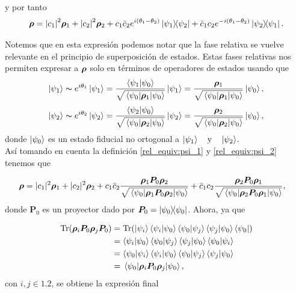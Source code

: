 \documentclass[../Main.tex]{subfiles}
\begin{document}
y por tanto 
\begin{equation}
    \bm{\rho} = \abs{c_1}^2\bm{\rho}_1+\abs{c_2}^2\bm{\rho}_2+c_1\bar{c}_2 e^{i(\theta_1-\theta_2)}\op{\psi_1}{\psi_2}+\bar{c}_1c_2 e^{-i(\theta_1-\theta_2)}\op{\psi_2}{\psi_1}.
\end{equation}

Notemos que en esta expresión podemos notar que la fase relativa se vuelve relevante en el principio de superposición de estados. Estas fases relativas nos permiten expresar a $\bm{\rho}$ solo en términos de operadores de estados usando que
\begin{equation}
    \ket{\psi_1}\thicksim  e^{i\theta_1}\ket{\psi_1}=\frac{\ip{\psi_1}{\psi_0}}{\sqrt{\expval{\rhon_1}{\psi_0}}}\ket{\psi_1}=\frac{\rhon_1}{\sqrt{\expval{\rhon_1}{\psi_0}}}\ket{\psi_0},
    \label{rel_equiv:psi_1}
\end{equation}
\begin{equation}
    \ket{\psi_2}\thicksim  e^{i\theta_2}\ket{\psi_2}=\frac{\ip{\psi_2}{\psi_0}}{\sqrt{\expval{\rhon_2}{\psi_0}}}\ket{\psi_2}=\frac{\rhon_2}{\sqrt{\expval{\rhon_2}{\psi_0}}}\ket{\psi_0},
    \label{rel_equiv:psi_2}
\end{equation}
donde $\ket{\psi_0}$ es un estado fiducial no ortogonal a $\ket{\psi_1} \qq{y} \ket{\psi_2}$.\\Así tomando en cuenta la definición \eqref{rel_equiv:psi_1} y \eqref{rel_equiv:psi_2} tenemos que

\begin{align}
  \bm{\rho} &=
    |c_1|^2 \bm{\rho}_1
    + |c_2|^2 \bm{\rho}_2
    + c_1 \bar{c}_2
      \frac{\bm{\rho}_1 \bm{P}_0 \bm{\rho}_2}
           {\sqrt{\expval{\bm{\rho}_1\bm{P}_0\bm{\rho}_2}{\psi_0}}}
    + \bar{c}_1 c_2 
      \frac{\bm{\rho}_2 \bm{P}_0 \bm{\rho}_1}
           {\sqrt{\expval{\bm{\rho}_2\bm{P}_0\bm{\rho}_1}{\psi_0}}},  
\end{align}
donde $\bm{P}_0$ es un proyector dado por $\bm{P}_0 = \op{\psi_0}$. Ahora, ya que 

\begin{align}
    \Tr(\rhon_i\bm{P}_0\rhon_j\bm{P}_0)&=
    \Tr(\ket{\psi_i}\ip{\psi_i}{\psi_0}\ip{\psi_0}{\psi_j}\ip{\psi_j}{\psi_0}\bra{\psi_0})\notag\\
    &=\ip{\psi_i}{\psi_0}\ip{\psi_0}{\psi_j}\ip{\psi_j}{\psi_0}\ip{\psi_0}{\psi_i}\notag\\
    &=\ip{\psi_0}{\psi_i}\ip{\psi_i}{\psi_0}\ip{\psi_0}{\psi_j}\ip{\psi_j}{\psi_0}\notag\\
    &=\expval{\rhon_i\bm{P}_0\rhon_j}{\psi_0},
\end{align}
con $i,j\in\qty{1,2}$, se obtiene la expresión final
\end{document}

